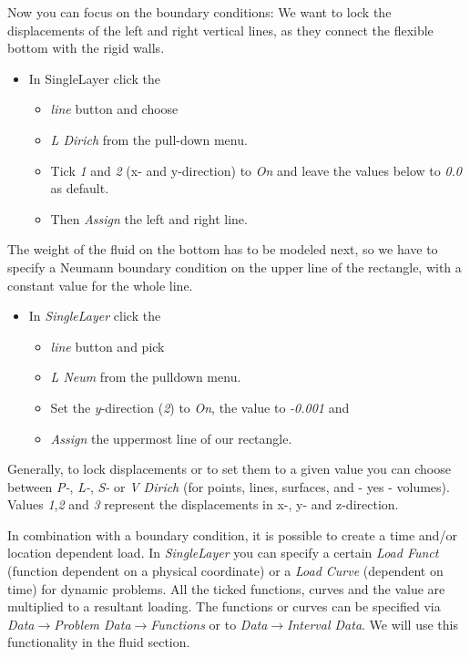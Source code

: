 Now you can focus on the boundary conditions: We want to lock the
displacements of the left and right vertical lines, as they connect
the flexible bottom with the rigid walls.

\begin{itemize}
\item In SingleLayer click the

\begin{itemize}
\item \emph{line} button and choose
\item \emph{L Dirich} from the pull-down menu.
\item Tick \emph{1} and \emph{2} (x- and y-direction) to \emph{On} and leave
the values below to \emph{0.0} as default.
\item Then \emph{Assign} the left and right line.
\end{itemize}
\end{itemize}
The weight of the fluid on the bottom has to be modeled next, so we
have to specify a Neumann boundary condition on the upper line of
the rectangle, with a constant value for the whole line.

\begin{itemize}
\item In \emph{SingleLayer} click the

\begin{itemize}
\item \emph{line} button and pick
\item \emph{L Neum} from the pulldown menu.
\item Set the \emph{y}-direction (\emph{2}) to \emph{On}, the value to \emph{-0.001} and
\item \emph{Assign} the uppermost line of our rectangle.
\end{itemize}
\end{itemize}
Generally, to lock displacements or to set them to a given value you
can choose between \emph{P-}, \emph{L-}, \emph{S-} or \emph{V Dirich}
(for points, lines, surfaces, and - yes - volumes). Values \emph{1},\emph{2}
and \emph{3} represent the displacements in x-, y- and z-direction.

In combination with a boundary condition, it is possible to
create a time and/or location dependent load. In \emph{SingleLayer}
you can specify a certain \emph{Load Funct} (function dependent on
a physical coordinate) or a \emph{Load Curve} (dependent on time)
for dynamic problems. All the ticked functions, curves and the value
are multiplied to a resultant loading. The functions or curves can
be specified via \emph{Data$\to$Problem Data$\to$Functions} or to
\emph{Data$\to$Interval Data}. We will use this functionality in the fluid section.


